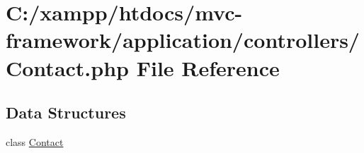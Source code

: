 \hypertarget{controllers_2_contact_8php}{}\section{C\+:/xampp/htdocs/mvc-\/framework/application/controllers/\+Contact.php File Reference}
\label{controllers_2_contact_8php}
\subsection*{Data Structures}
\begin{DoxyCompactItemize}
\item 
class \hyperlink{class_contact}{Contact}
\end{DoxyCompactItemize}
